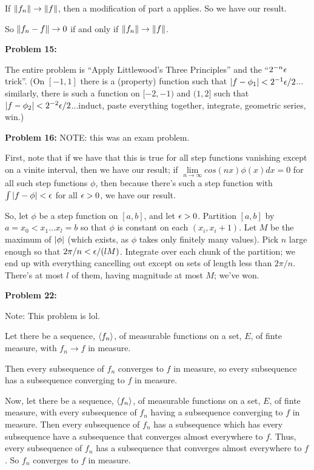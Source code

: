 \documentclass[a4paper,12pt]{article}
\begin{document}
If $\|f_n\| \to \|f\|$, then a modification of part a applies. So we have our result.

So $\|f_n - f\| \to 0$ if and only if $\|f_n\| \to \|f\|$.

\shunt

{\bf Problem 15:}

The entire problem is ``Apply Littlewood's Three Principles'' and the ``$2^{-n}\epsilon$ trick''. (On $[-1,1]$ there is a (property) function such that $\left\lvert f-\phi_1 \right\rvert < 2^{-1}\epsilon/2$... similarly, there is such a function on $[-2,-1)$ and $(1,2]$ such that $\left\lvert f-\phi_2 \right\rvert < 2^{-2}\epsilon/2$...induct, paste everything together, integrate, geometric series, win.)

\shunt

{\bf Problem 16:} NOTE: this was an exam problem.

First, note that if we have that this is true for all step functions vanishing except on a vinite interval, then we have our result; if $\lim\limits_{n \to \infty} cos(nx)\phi(x) dx = 0$ for all such step functions $\phi$, then because there's such a step function with $\int\left\lvert f - \phi \right\rvert < \epsilon$ for all $\epsilon>0$, we have our result.

So, let $\phi$ be a step function on $[a,b]$, and let $\epsilon>0$. Partition $[a,b]$ by $a = x_0 < x_1 \ldots x_l = b$ so that $\phi$ is constant on each $(x_i,x_i+1)$. Let $M$ be the maximum of $\left\lvert \phi \right\rvert$ (which exists, as $\phi$ takes only finitely many values). Pick $n$ large enough so that $2\pi / n < \epsilon /(lM)$. Integrate over each chunk of the partition; we end up with everything cancelling out except on sets of length less than $2\pi/n$. There's at most $l$ of them, having magnitude at most $M$; we've won.

\shunt

{\bf Problem 22:}

Note: This problem is lol.

Let there be a sequence, $\left\langle f_n \right\rangle$, of measurable functions on a set, $E$, of finte measure, with $f_n \to f$ in measure.

Then every subsequence of $f_n$ converges to $f$ in measure, so every subsequence has a subsequence converging to $f$ in measure.

Now, let there be a sequence, $\left\langle f_n \right\rangle$, of measurable functions on a set, $E$, of finte measure, with every subsequence of $f_n$ having a subsequence converging to $f$ in measure.  Then every subsequence of $f_n$ has a  subsequence which has every subsequence have a subsequence that converges almost everywhere to $f$. Thus, every subsequence of $f_n$ has a subsequence that converges almost everywhere to $f$. So $f_n$ converges to $f$ in measure.
\end{document}
